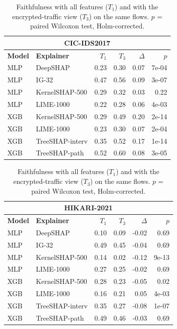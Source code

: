 \begin{table}[!htbp]
\centering
\caption{Faithfulness with all features ($T_1$) and with the encrypted-traffic view ($T_3$) on the same flows. $p$ = paired Wilcoxon test, Holm-corrected.}
\label{tab:tier}
\scriptsize
\setlength{\tabcolsep}{2.5pt}
\begin{minipage}[t]{0.495\textwidth}
\centering
\begin{tabular}{llrrrr}
\toprule
\multicolumn{6}{c}{\textbf{CIC-IDS2017}} \\
\midrule
\textbf{Model} & \textbf{Explainer} & \textbf{$T_1$} & \textbf{$T_3$} & \textbf{$\Delta$} & \textbf{$p$} \\
\midrule
MLP & DeepSHAP & 0.23 & 0.30 & 0.07 & 7e-04 \\
MLP & IG-32 & 0.47 & 0.56 & 0.09 & 3e-07 \\
MLP & KernelSHAP-500 & 0.29 & 0.32 & 0.03 & 0.22 \\
MLP & LIME-1000 & 0.22 & 0.28 & 0.06 & 4e-03 \\
XGB & KernelSHAP-500 & 0.29 & 0.49 & 0.20 & 2e-14 \\
XGB & LIME-1000 & 0.23 & 0.30 & 0.07 & 2e-04 \\
XGB & TreeSHAP-interv & 0.35 & 0.52 & 0.17 & 1e-14 \\
XGB & TreeSHAP-path & 0.52 & 0.60 & 0.08 & 3e-05 \\
\bottomrule
\end{tabular}
\end{minipage}
\hfill
\begin{minipage}[t]{0.495\textwidth}
\centering
\begin{tabular}{llrrrr}
\toprule
\multicolumn{6}{c}{\textbf{HIKARI-2021}} \\
\midrule
\textbf{Model} & \textbf{Explainer} & \textbf{$T_1$} & \textbf{$T_3$} & \textbf{$\Delta$} & \textbf{$p$} \\
\midrule
MLP & DeepSHAP & 0.10 & 0.09 & -0.02 & 0.69 \\
MLP & IG-32 & 0.49 & 0.45 & -0.04 & 0.69 \\
MLP & KernelSHAP-500 & 0.14 & 0.02 & -0.12 & 9e-13 \\
MLP & LIME-1000 & 0.27 & 0.25 & -0.02 & 0.69 \\
XGB & KernelSHAP-500 & 0.28 & 0.23 & -0.05 & 0.02 \\
XGB & LIME-1000 & 0.16 & 0.21 & 0.05 & 4e-03 \\
XGB & TreeSHAP-interv & 0.35 & 0.27 & -0.08 & 1e-07 \\
XGB & TreeSHAP-path & 0.49 & 0.46 & -0.03 & 0.69 \\
\bottomrule
\end{tabular}
\end{minipage}
\end{table}
